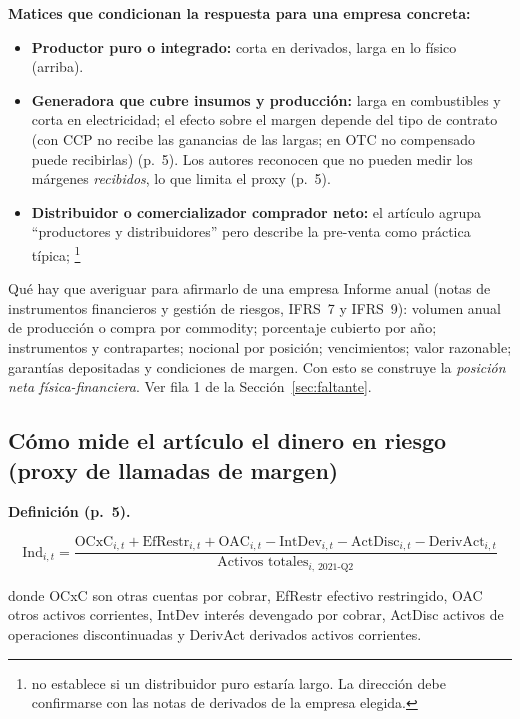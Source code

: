 \documentclass{article} %
\newcommand{\pg}[1]{(p.~#1)}
\begin{document}
\textbf{Matices que condicionan la respuesta para una empresa concreta:}
\begin{itemize}
    \item \textbf{Productor puro o integrado:} corta en derivados, larga en lo físico (arriba).
    \item \textbf{Generadora que cubre insumos y producción:} larga en combustibles y corta en electricidad; el efecto sobre el margen depende del tipo de contrato (con CCP no recibe las ganancias de las largas; en OTC no compensado puede recibirlas) \pg{5}. Los autores reconocen que no pueden medir los márgenes \emph{recibidos}, lo que limita el proxy \pg{5}.
    \item \textbf{Distribuidor o comercializador comprador neto:} el artículo agrupa ``productores y distribuidores'' pero describe la pre-venta como práctica típica; \footnote{no establece si un distribuidor puro estaría largo. La dirección debe confirmarse con las notas de derivados de la empresa elegida.}
\end{itemize}

\begin{pendiente}{Qué hay que averiguar para afirmarlo de una empresa}
    Informe anual (notas de instrumentos financieros y gestión de riesgos, IFRS~7 y IFRS~9): volumen anual de producción o compra por commodity; porcentaje cubierto por año; instrumentos y contrapartes; nocional por posición; vencimientos; valor razonable; garantías depositadas y condiciones de margen. Con esto se construye la \emph{posición neta física-financiera}. Ver fila 1 de la Sección~\ref{sec:faltante}.
\end{pendiente}

    \subsection{Cómo mide el artículo el dinero en riesgo (proxy de llamadas de margen)}

    \textbf{Definición \pg{5}.}

    \[
    \text{Ind}_{i,t}=\frac{\text{OCxC}_{i,t}+\text{EfRestr}_{i,t}+\text{OAC}_{i,t}-\text{IntDev}_{i,t}-\text{ActDisc}_{i,t}-\text{DerivAct}_{i,t}}{\text{Activos totales}_{i,\,2021\text{-Q2}}}
    \]

    donde OCxC son otras cuentas por cobrar, EfRestr efectivo restringido, OAC otros activos corrientes, IntDev interés devengado por cobrar, ActDisc activos de operaciones discontinuadas y DerivAct derivados activos corrientes.
    
\end{document}
